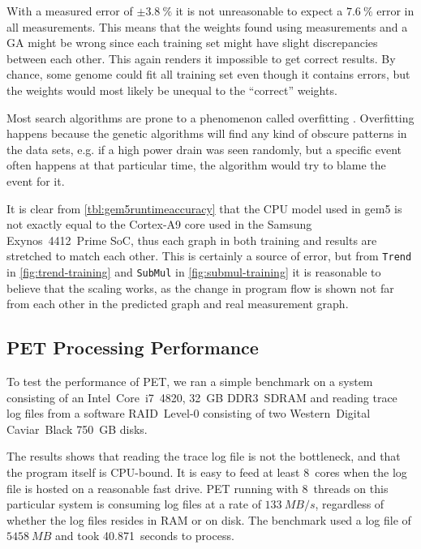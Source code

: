 With a measured error of $\pm3.8~\%$ it is not unreasonable to expect a $7.6~\%$
error in all measurements. This means that the weights found using measurements
and a GA might be wrong since each training set might have slight discrepancies
between each other. This again renders it impossible to get correct results. By
chance, some genome could fit all training set even though it contains errors,
but the weights would most likely be unequal to the ``correct'' weights.

Most search algorithms are prone to a phenomenon called overfitting
\cite{russellnorvig}. Overfitting happens because the genetic algorithms will
find any kind of obscure patterns in the data sets, e.g. if a high power drain
was seen randomly, but a specific event often happens at that particular time,
the algorithm would try to blame the event for it.

It is clear from \autoref{tbl:gem5runtimeaccuracy} that the CPU model used in
gem5 is not exactly equal to the Cortex-A9 core used in the Samsung
Exynos~4412~Prime SoC, thus each graph in both training and results are
stretched to match each other. This is certainly a source of error, but from
\texttt{Trend} in \autoref{fig:trend-training} and \texttt{SubMul} in
\autoref{fig:submul-training} it is reasonable to believe that the scaling
works, as the change in program flow is shown not far from each other in the
predicted graph and real measurement graph.


\subsection{PET Processing Performance}

To test the performance of PET, we ran a simple benchmark on a system consisting of an
Intel~Core~i7~4820, 32~GB DDR3~SDRAM and reading trace log files from a software
RAID~Level-0 consisting of two Western~Digital Caviar~Black 750~GB disks.

The results shows that reading the trace log file is not the bottleneck, and
that the program itself is CPU-bound. It is easy to feed at least 8~cores when
the log file is hosted on a reasonable fast drive. PET running with 8~threads on
this particular system is consuming log files at a rate of $133~MB/s$,
regardless of whether the log files resides in RAM or on disk. The benchmark used
a log file of $5458~MB$ and took 40.871~seconds to process.

